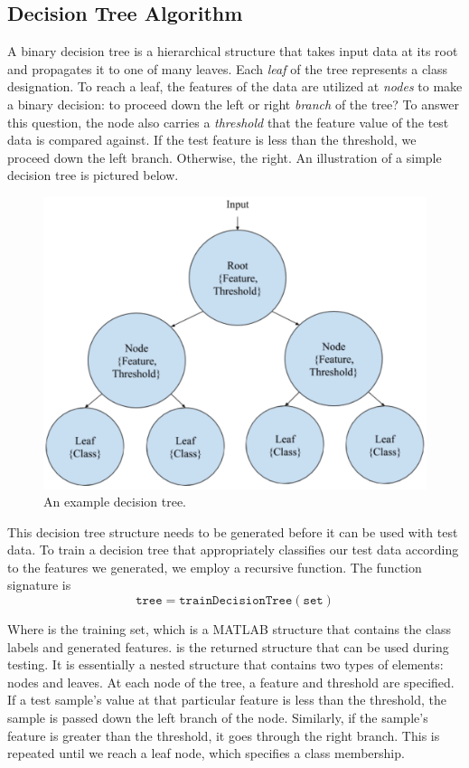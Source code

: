 \subsection{Decision Tree Algorithm}

A binary decision tree is a hierarchical structure that takes input data at its root and propagates it to one of many leaves. Each \emph{leaf} of the tree represents a class designation. To reach a leaf, the features of the data are utilized at \emph{nodes} to make a binary decision: to proceed down the left or right \emph{branch} of the tree? To answer this question, the node also carries a \emph{threshold} that the feature value of the test data is compared against. If the test feature is less than the threshold, we proceed down the left branch. Otherwise, the right. An illustration of a simple decision tree is pictured below.
%
\begin{figure}[H]
  \centering\includegraphics[width=0.4\columnwidth]{../images/decision_tree}
  \caption{An example decision tree.}
\end{figure}

This decision tree structure needs to be generated before it can be used with test data. To train a decision tree that appropriately classifies our test data according to the features we generated, we employ a recursive function. The function signature is
%
\begin{equation*}
  \mathtt{tree = trainDecisionTree(set)}
\end{equation*}

Where  is the training set, which is a MATLAB structure that contains the class labels and generated features.  is the returned structure that can be used during testing. It is essentially a nested structure that contains two types of elements: nodes and leaves. At each node of the tree, a feature and threshold are specified. If a test sample's value at that particular feature is less than the threshold, the sample is passed down the left branch of the node. Similarly, if the sample's feature is greater than the threshold, it goes through the right branch. This is repeated until we reach a leaf node, which specifies a class membership. 

